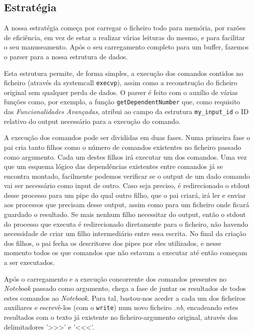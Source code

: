 \documentclass[a4paper]{article}
\begin{document}
\subsection{Estratégia}

A nossa estratégia começa por carregar o ficheiro todo para memória, por razões de eficiência, em vez de estar a realizar várias 
leituras do mesmo, e para facilitar o seu manuseamento. Após o seu carregamento completo para um buffer, fazemos o parser para a nossa 
estrutura de dados. 


Esta estrutura permite, de forma simples, a execução dos comandos contidos no ficheiro (através da systemcall \texttt{execvp}),
assim como a reconstrução do ficheiro original sem qualquer perda de dados. O parser é feito com o auxílio de várias funções como, por 
exemplo, a função \texttt {getDependentNumber} que, como requisito das \textit{Funcionalidades Avançadas}, atribui ao campo da 
estrutura \texttt{my\_input\_id} o ID relativo do output necessário para a execução do comando.

A execução dos comandos pode ser divididas em duas fases. Numa primeira fase o pai cria tanto filhos como o número de comandos existentes no ficheiro passado como argumento. 
Cada um destes filhos irá executar um dos comandos. Uma vez que um esquema lógico das dependências existentes entre comandos já se encontra montado, facilmente podemos
verificar se o output de um dado comando vai ser necessário como input de outro. Caso seja preciso, é redirecionado o stdout desse processo para um pipe do qual outro
filho, que o pai criará, irá ler e enviar aos processos que precisam desse output, assim como para um ficheiro onde ficará guardado o resultado. Se mais nenhum filho 
necessitar do output, então o stdout do processo que executa é redirecionado diretamente para o ficheiro, não havendo necessidade de criar um filho intermediário entre
essa escrita. No final da criação dos filhos, o pai fecha os descritores dos pipes por eles utilizados, e nesse momento todos os que comandos que não estavam a executar 
até então começam a ser executados.

Após o carregamento e a execução concorrente dos comandos presentes no \textit{Notebook} passado como argumento, chega a fase de juntar os resultados 
de todos estes comandos ao \textit{Notebook}. Para tal, bastou-nos aceder a cada um dos ficheiros auxiliares e escrevê-los (com o \texttt{write}) num 
novo ficheiro \textit{.nb}, encadeando estes resultados com o texto já existente no ficheiro-argumento original, através dos delimitadores '>>>' e '<<<'. 
\end{document}
